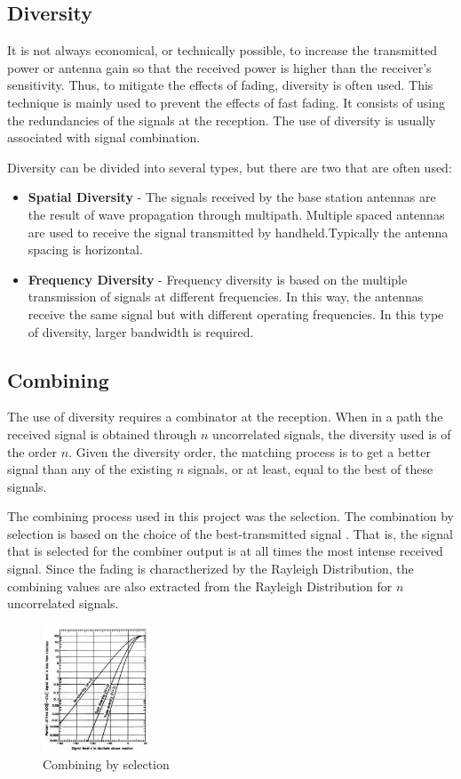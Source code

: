 \documentclass[letterpaper, 10 pt, conference]{ieeeconf}  %
\begin{document}
\subsection{Diversity}
It is not always economical, or technically possible, to increase the transmitted power or antenna gain so that the received power is higher than the receiver's sensitivity. Thus, to mitigate the effects of fading, diversity is often used.
This technique is mainly used to prevent the effects of fast fading. It consists of using the redundancies of the signals at the reception. The use of diversity is usually associated with signal combination.
\par\noindent
Diversity can be divided into several types, but there are two that are often used:
\begin{itemize}
    \item \textbf{Spatial Diversity} - The signals received by the base station antennas are the result of wave propagation through multipath. Multiple spaced antennas are used to receive the signal transmitted by handheld.Typically the antenna spacing is horizontal.
    \item\textbf{Frequency Diversity} - Frequency diversity is based on the multiple transmission of signals at different frequencies. In this way, the antennas receive the same signal but with different operating frequencies. In this type of diversity, larger bandwidth is required.
\end{itemize}
\subsection{Combining}
The use of diversity requires a combinator at the reception. When in a path the received signal is obtained through $ n $ uncorrelated signals, the diversity used is of the order $ n $. Given the diversity order, the matching process is to get a better signal than any of the existing $ n $ signals, or at least, equal to the best of these signals.\par\noindent
The combining process used in this project was the selection. The combination by selection is based on the choice of the best-transmitted signal . That is, the signal that is selected for the combiner output is at all times the most intense received signal. Since the fading is charactherized by the Rayleigh Distribution, the combining values are also extracted from the Rayleigh Distribution for $n$ uncorrelated signals. 
\begin{figure}[h]
    \centering
    \includegraphics[width=0.285\textwidth]{combinacaoRayleigh.jpg}
    \caption{Combining by selection}
    \label{fig:combining}
\end{figure} \FloatBarrier
\end{document}

